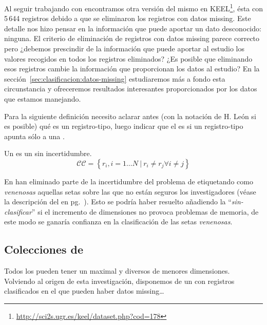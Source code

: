 Al seguir trabajando con \mushroom encontramos otra versión del mismo \dataset en KEEL\footnote{\url{http://sci2s.ugr.es/keel/dataset.php?cod=178}}, ésta con 5\,644 registros debido a que se eliminaron los registros con datos missing. Este detalle nos hizo pensar en la información que puede aportar un dato desconocido: ninguna. El criterio de eliminación de registros con datos missing parece correcto pero ¿debemos prescindir de la información que puede aportar al estudio los valores recogidos en todos los registros eliminados? ¿Es posible que eliminando esos registros cambie la información que proporcionan los datos al estudio? En la sección~\ref{sec:clasificacion:datos-missing} estudiaremos más a fondo esta circunstancia y ofreceremos resultados interesantes proporcionados por los datos que estamos manejando.



Para la siguiente definición necesito aclarar antes (con la notación de H. León si es posible) qué es un registro-tipo, luego indicar que el \catalogo es \CC si un registro-tipo apunta sólo a una \clase.

\begin{Definition}[\CC] Un \CC es un \catalogo sin incertidumbre.
   $$\mathcal{CC} = \left\{r_i, i = 1\ldots N\ | \ r_i \neq r_j \forall i \neq j\right\}$$
\label{def:catalogo-completo}
\end{Definition}

En \mushroom han eliminado parte de la incertidumbre del problema de \clasificacion etiquetando como \emph{venenosas} aquellas setas sobre las que no están seguros los investigadores (véase la descripción del \dataset en pg.~\pageref{cita:incertidumbre-suprimida-en-mushroom}). Esto se podría haber resuelto añadiendo la \clase "`\emph{sin-clasificar}"' si el incremento de dimensiones no provoca problemas de memoria, de este modo se ganaría confianza en la clasificación de las setas \emph{venenosas}.







\subsection{Colecciones de \CCs}
\label{sec:clasificacion:catalogo-completo:colecciones}
%

Todos los \CCs pueden tener un \CC maximal y diversos \CCs de menores dimensiones. Volviendo al origen de esta investigación, disponemos de un \dataset con registros clasificados en el que pueden haber datos missing\ldots 

